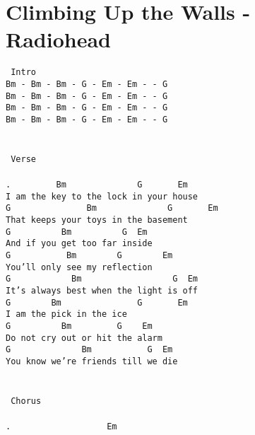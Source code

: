 \newpage
\section{Climbing Up the Walls - Radiohead}
\label{Climbing Up the Walls - Radiohead}
\texttt{\lbrack\ Intro\rbrack\\
Bm\ -\ Bm\ -\ Bm\ -\ G\ -\ Em\ -\ Em\ -\ -\ G\\
Bm\ -\ Bm\ -\ Bm\ -\ G\ -\ Em\ -\ Em\ -\ -\ G\\
Bm\ -\ Bm\ -\ Bm\ -\ G\ -\ Em\ -\ Em\ -\ -\ G\\
Bm\ -\ Bm\ -\ Bm\ -\ G\ -\ Em\ -\ Em\ -\ -\ G\\
\\
\\
\lbrack\ Verse\rbrack\\
\\
. \ \ \ \ \ \ \ \ Bm\ \ \ \ \ \ \ \ \ \ \ \ \ \ G\ \ \ \ \ \ \ Em\\
I\ am\ the\ key\ to\ the\ lock\ in\ your\ house\\
G\ \ \ \ \ \ \ \ \ \ \ \ \ \ \ Bm\ \ \ \ \ \ \ \ \ \ \ \ \ \ G\ \ \ \ \ \ \ Em\\
That\ keeps\ your\ toys\ in\ the\ basement\\
G\ \ \ \ \ \ \ \ \ \ Bm\ \ \ \ \ \ \ \ \ \ G\ \ Em\\
And\ if\ you\ get\ too\ far\ inside\\
G\ \ \ \ \ \ \ \ \ \ \ Bm\ \ \ \ \ \ \ \ G\ \ \ \ \ \ \ \ Em\\
You'll\ only\ see\ my\ reflection\\
G \ \ \ \ \ \ \ \ \ \ \ Bm\ \ \ \ \ \ \ \ \ \ \ \ \ \ \ \ \ \ G\ \ Em\\
It's\ always\ best\ when\ the\ light\ is\ off\\
G\ \ \ \ \ \ \ \ Bm\ \ \ \ \ \ \ \ \ \ \ \ \ \ \ G\ \ \ \ \ \ \ Em\\
I\ am\ the\ pick\ in\ the\ ice\\
G\ \ \ \ \ \ \ \ \ \ Bm\ \ \ \ \ \ \ \ \ G\ \ \ \ Em\\
Do\ not\ cry\ out\ or\ hit\ the\ alarm\\
G\ \ \ \ \ \ \ \ \ \ \ \ \ \ Bm\ \ \ \ \ \ \ \ \ \ \ G\ \ Em\\
You\ know\ we're\ friends\ till\ we\ die\\
\\
\\
\lbrack\ Chorus\rbrack\\
\\
. \ \ \ \ \ \ \ \ \ \ \ \ \ \ \ \ \ \ Em\\
}
